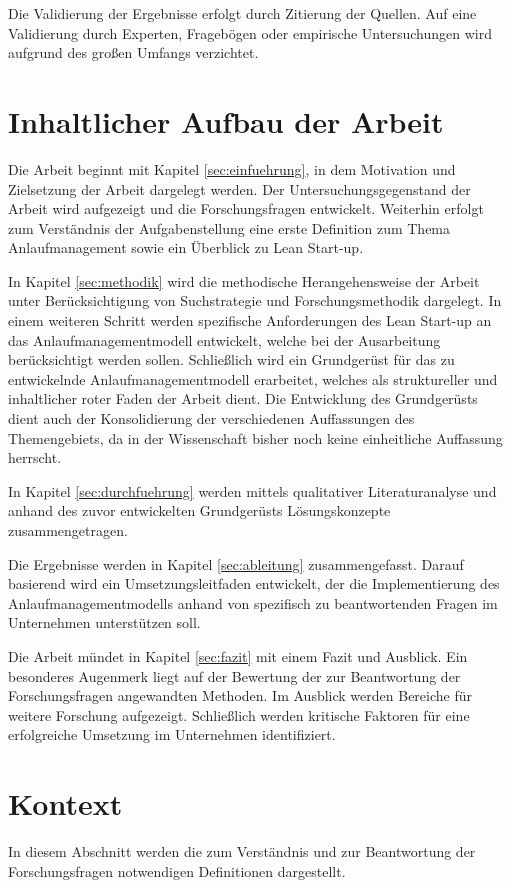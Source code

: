 Die Validierung der Ergebnisse erfolgt durch Zitierung der Quellen. Auf eine Validierung durch Experten, Fragebögen oder empirische Untersuchungen wird aufgrund des großen Umfangs verzichtet. 

\section{Inhaltlicher Aufbau der Arbeit}
Die Arbeit beginnt mit Kapitel \ref{sec:einfuehrung}, in dem Motivation und Zielsetzung der Arbeit dargelegt werden. Der Untersuchungsgegenstand der Arbeit wird aufgezeigt und die Forschungsfragen entwickelt. Weiterhin erfolgt zum Verständnis der Aufgabenstellung eine erste Definition zum Thema Anlaufmanagement sowie ein Überblick zu Lean Start-up.

In Kapitel \ref{sec:methodik} wird die methodische Herangehensweise der Arbeit unter Berücksichtigung von Suchstrategie und Forschungsmethodik dargelegt. %
In einem weiteren Schritt werden spezifische Anforderungen des Lean Start-up an das Anlaufmanagementmodell entwickelt, welche bei der Ausarbeitung berücksichtigt werden sollen. Schließlich wird ein Grundgerüst für das zu entwickelnde Anlaufmanagementmodell erarbeitet, welches als struktureller und inhaltlicher roter Faden der Arbeit dient. %
Die Entwicklung des Grundgerüsts dient auch der Konsolidierung der verschiedenen Auffassungen des Themengebiets, da in der Wissenschaft bisher noch keine einheitliche Auffassung herrscht. 

In Kapitel \ref{sec:durchfuehrung} werden mittels qualitativer Literaturanalyse und anhand des zuvor entwickelten Grundgerüsts Lösungskonzepte zusammengetragen. 

Die Ergebnisse werden in Kapitel \ref{sec:ableitung} zusammengefasst. Darauf basierend wird ein Umsetzungsleitfaden entwickelt, der die Implementierung des Anlaufmanagementmodells anhand von spezifisch zu beantwortenden Fragen im Unternehmen unterstützen soll. 

Die Arbeit mündet in Kapitel \ref{sec:fazit} mit einem Fazit und Ausblick. Ein besonderes Augenmerk liegt auf der Bewertung der zur Beantwortung der Forschungsfragen angewandten Methoden. Im Ausblick werden Bereiche für weitere Forschung aufgezeigt. Schließlich werden kritische Faktoren für eine erfolgreiche Umsetzung im Unternehmen identifiziert. 

\section{Kontext}
In diesem Abschnitt werden die zum Verständnis und zur Beantwortung der Forschungsfragen notwendigen Definitionen dargestellt. 
